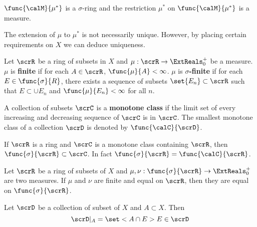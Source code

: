 \begin{theorem}
    \(\func{\calM}{\mu^{\ast}}\) is a \(\sigma\)-ring and the restriction \(\mu^{\ast}\) on \(\func{\calM}{\mu^{\ast}}\) is a measure.
\end{theorem}

\begin{remark}
    The extension of \(\mu\) to \(\mu^{\ast}\) is not necessarily unique. However, by placing certain requirements on \(X\) we can deduce uniqueness.
\end{remark}

\begin{definition}
    Let \(\scrR\) be a ring of subsets in \(X\) and \(\mu:\scrR \to \ExtReals^+_0\) be a measure. \(\mu\) is \textbf{finite} if for each \(A \in \scrR\), \(\func{\mu}{A} < \infty\). \(\mu\) is \textbf{\(\sigma\)-finite} if for each \(E \in \func{\sigma}{R}\), there exists a sequence of subsets \(\set{E_n} \subset \scrR\) such that \(E \subset \cup E_n\) and \(\func{\mu}{E_n} < \infty\) for all \(n\).
\end{definition}

\begin{definition}
    A collection of subsets \(\scrC\) is a \textbf{monotone class} if the limit set of every increasing and decreasing sequence  of \(\scrC\) is in \(\scrC\). The smallest monotone class of a collection \(\scrD\) is denoted by \(\func{\calC}{\scrD}\).
\end{definition}

\begin{theorem}
    If \(\scrR\) is a ring and \(\scrC\) is a monotone class containing \(\scrR\), then \(\func{\sigma}{\scrR} \subset \scrC\). In fact \(\func{\sigma}{\scrR}  = \func{\calC}{\scrR}\).
\end{theorem}

\begin{corollary}
    Let \(\scrR\) be a ring of subsets of \(X\) and \(\mu,\nu: \func{\sigma}{\scrR} \to \ExtReals^+_0\) are two measures. If \(\mu\) and \(\nu\) are finite and equal on \(\scrR\), then they are equal on \(\func{\sigma}{\scrR}\).
\end{corollary}

\begin{definition}
    Let \(\scrD\) be a collection of subset of \(X\) and \(A \subset X\). Then 
    \begin{equation*}
        \scrD|_A = \set<A \cap E>{E \in \scrD}
    \end{equation*}
\end{definition}

